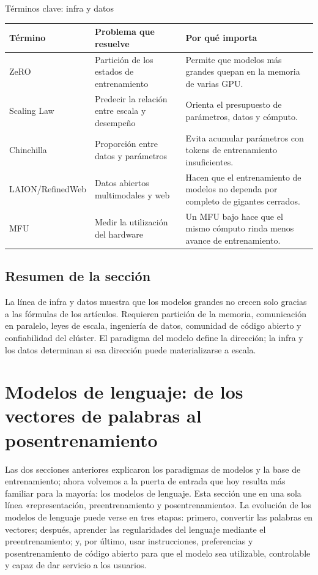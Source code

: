 \documentclass[a4paper]{article}
\begin{document}
\begin{knowledgebox}{Términos clave: infra y datos}
\begin{tabularx}{\textwidth}{p{}p{}X}
\toprule
Término & Problema que resuelve & Por qué importa \\
\midrule
ZeRO & Partición de los estados de entrenamiento & Permite que modelos más grandes quepan en la memoria de varias GPU. \\
Scaling Law & Predecir la relación entre escala y desempeño & Orienta el presupuesto de parámetros, datos y cómputo. \\
Chinchilla & Proporción entre datos y parámetros & Evita acumular parámetros con tokens de entrenamiento insuficientes. \\
LAION/RefinedWeb & Datos abiertos multimodales y web & Hacen que el entrenamiento de modelos no dependa por completo de gigantes cerrados. \\
MFU & Medir la utilización del hardware & Un MFU bajo hace que el mismo cómputo rinda menos avance de entrenamiento. \\
\bottomrule
\end{tabularx}
\end{knowledgebox}

\subsection{Resumen de la sección}

La línea de infra y datos muestra que los modelos grandes no crecen solo gracias a las fórmulas de los artículos. Requieren partición de la memoria, comunicación en paralelo, leyes de escala, ingeniería de datos, comunidad de código abierto y confiabilidad del clúster. El paradigma del modelo define la dirección; la infra y los datos determinan si esa dirección puede materializarse a escala.
\section{Modelos de lenguaje: de los vectores de palabras al posentrenamiento}

Las dos secciones anteriores explicaron los paradigmas de modelos y la base de entrenamiento; ahora volvemos a la puerta de entrada que hoy resulta más familiar para la mayoría: los modelos de lenguaje. Esta sección une en una sola línea «representación, preentrenamiento y posentrenamiento». La evolución de los modelos de lenguaje puede verse en tres etapas: primero, convertir las palabras en vectores; después, aprender las regularidades del lenguaje mediante el preentrenamiento; y, por último, usar instrucciones, preferencias y posentrenamiento de código abierto para que el modelo sea utilizable, controlable y capaz de dar servicio a los usuarios.
\end{document}
